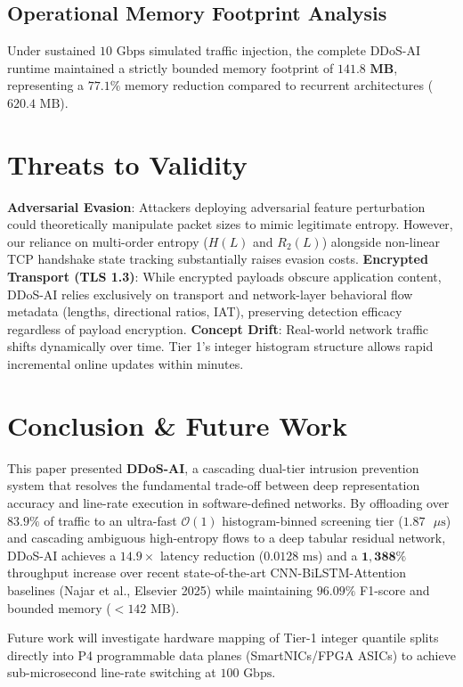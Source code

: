 \documentclass[journal]{IEEEtran}
\begin{document}
\subsection{Operational Memory Footprint Analysis}
Under sustained $10\text{ Gbps}$ simulated traffic injection, the complete DDoS-AI runtime maintained a strictly bounded memory footprint of $\mathbf{141.8\text{ MB}}$, representing a $77.1\%$ memory reduction compared to recurrent architectures ($620.4\text{ MB}$).

\section{Threats to Validity}
\textbf{Adversarial Evasion}: Attackers deploying adversarial feature perturbation could theoretically manipulate packet sizes to mimic legitimate entropy. However, our reliance on multi-order entropy ($H(L)$ and $R_2(L)$) alongside non-linear TCP handshake state tracking substantially raises evasion costs.
\textbf{Encrypted Transport (TLS 1.3)}: While encrypted payloads obscure application content, DDoS-AI relies exclusively on transport and network-layer behavioral flow metadata (lengths, directional ratios, IAT), preserving detection efficacy regardless of payload encryption.
\textbf{Concept Drift}: Real-world network traffic shifts dynamically over time. Tier 1's integer histogram structure allows rapid incremental online updates within minutes.

\section{Conclusion \& Future Work}
This paper presented \textbf{DDoS-AI}, a cascading dual-tier intrusion prevention system that resolves the fundamental trade-off between deep representation accuracy and line-rate execution in software-defined networks. By offloading over $83.9\%$ of traffic to an ultra-fast $\mathcal{O}(1)$ histogram-binned screening tier ($1.87\text{ }\mu\text{s}$) and cascading ambiguous high-entropy flows to a deep tabular residual network, DDoS-AI achieves a $\mathbf{14.9\times}$ latency reduction ($0.0128\text{ ms}$) and a $\mathbf{1,388\%}$ throughput increase over recent state-of-the-art CNN-BiLSTM-Attention baselines (Najar et al., Elsevier 2025) while maintaining $96.09\%$ F1-score and bounded memory ($<142\text{ MB}$).

Future work will investigate hardware mapping of Tier-1 integer quantile splits directly into P4 programmable data planes (SmartNICs/FPGA ASICs) to achieve sub-microsecond line-rate switching at $100\text{ Gbps}$.
\end{document}

